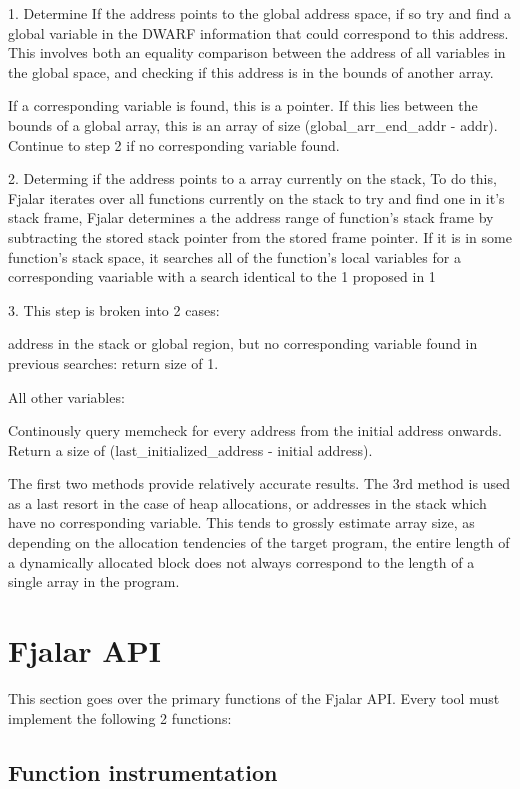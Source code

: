 \documentclass[11pt]{article}
\begin{document}
1. Determine If the address points to the global address space, if so
   try and find a global variable in the DWARF information that could
   correspond to this address. This involves both an equality comparison
   between the address of all variables in the global space, and checking
   if this address is in the bounds of another array.
   
   If a corresponding variable is found, this is a pointer. If this lies
   between the bounds of a global array, this is an array of size
   (global\_arr\_end\_addr - addr). Continue to step 2 if no
   corresponding variable found.

2. Determing if the address points to a array currently on the stack,
   To do this, Fjalar iterates over all functions currently on the
   stack to try and find one in it's stack frame, Fjalar determines a
   the address range of function's stack frame by subtracting the
   stored stack pointer from the stored frame pointer. If it is in
   some function's stack space, it searches all of the function's
   local variables for a corresponding vaariable with a search
   identical to the 1 proposed in 1

3. This step is broken into 2 cases:

   address in the stack or global region, but no corresponding
   variable found in previous searches: return size of 1.

   All other variables:
   
   Continously query memcheck for every address from the initial
   address onwards. Return a size of (last\_initialized\_address -
   initial address).


The first two methods provide relatively accurate results. The 3rd
method is used as a last resort in the case of heap allocations, or
addresses in the stack which have no corresponding variable. This
tends to grossly estimate array size, as depending on the allocation
tendencies of the target program, the entire length of a dynamically
allocated block does not always correspond to the length of a single
array in the program.


\section{Fjalar API}

This section goes over the primary functions of the Fjalar API. Every
tool must implement the following 2 functions:

\subsection{Function instrumentation}
\end{document}
